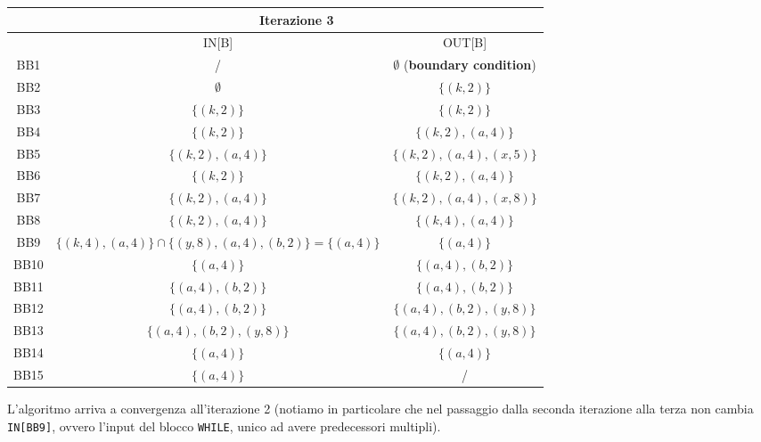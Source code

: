 \documentclass[10pt,a4paper]{article}
\begin{document}
\begin{table}[h!]
  \centering
  \renewcommand{\arraystretch}{1.2}
  \begin{tabular}{|c|c|c|}
  \hline
  \rowcolor{blue!30}
    & \multicolumn{2}{c|}{Iterazione 3} \\
    \hline
  \rowcolor{blue!30}
    & IN[B] & OUT[B] \\
  \hline
  BB1 & / & $\emptyset$ (\textbf{boundary condition}) \\
  \hline
  BB2 & $\emptyset$ & $\lbrace(k,2)\rbrace$ \\
  \hline
  BB3 & $\lbrace(k,2)\rbrace$ & $\lbrace(k,2)\rbrace$ \\
  \hline
  BB4 & $\lbrace(k,2)\rbrace$ & $\lbrace(k,2),(a,4)\rbrace$ \\
  \hline
  BB5 & $\lbrace(k,2),(a,4)\rbrace$ & $\lbrace(k,2),(a,4),(x,5)\rbrace$ \\
  \hline
  BB6 & $\lbrace(k,2)\rbrace$ & $\lbrace(k,2),(a,4)\rbrace$ \\
  \hline
  BB7 & $\lbrace(k,2),(a,4)\rbrace$ & $\lbrace(k,2),(a,4),(x,8)\rbrace$ \\
  \hline
  BB8 & $\lbrace(k,2),(a,4)\rbrace$ & $\lbrace(k,4),(a,4)\rbrace$ \\
  \hline
  BB9 & $\lbrace(k,4),(a,4)\rbrace\cap\lbrace(y,8),(a,4),(b,2)\rbrace=\lbrace(a,4)\rbrace$ & $\lbrace(a,4)\rbrace$ \\
  \hline
  BB10 & $\lbrace(a,4)\rbrace$ & $\lbrace(a,4),(b,2)\rbrace$\\
  \hline
  BB11 & $\lbrace(a,4),(b,2)\rbrace$ & $\lbrace(a,4),(b,2)\rbrace$ \\
  \hline
  BB12 & $\lbrace(a,4),(b,2)\rbrace$ & $\lbrace(a,4),(b,2),(y,8)\rbrace$ \\
  \hline
  BB13 & $\lbrace(a,4),(b,2),(y,8)\rbrace$ & $\lbrace(a,4),(b,2),(y,8)\rbrace$ \\
  \hline
  BB14 & $\lbrace(a,4)\rbrace$ & $\lbrace(a,4)\rbrace$ \\
  \hline
  BB15 & $\lbrace(a,4)\rbrace$ & / \\
  \hline
  \end{tabular}
\end{table}

L'algoritmo arriva a convergenza all'iterazione 2 (notiamo in particolare che nel passaggio dalla seconda iterazione alla terza non cambia \lstinline|IN[BB9]|, ovvero l'input del blocco \lstinline|WHILE|, unico ad avere predecessori multipli).
\end{document}
